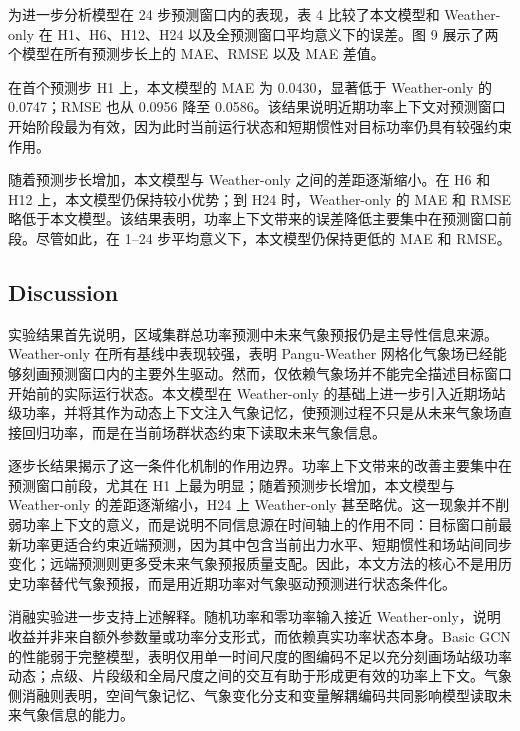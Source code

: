 为进一步分析模型在 24 步预测窗口内的表现，表 4 比较了本文模型和 Weather-only 在 H1、H6、H12、H24 以及全预测窗口平均意义下的误差。图 9 展示了两个模型在所有预测步长上的 MAE、RMSE 以及 MAE 差值。


在首个预测步 H1 上，本文模型的 MAE 为 0.0430，显著低于 Weather-only 的 0.0747；RMSE 也从 0.0956 降至 0.0586。该结果说明近期功率上下文对预测窗口开始阶段最为有效，因为此时当前运行状态和短期惯性对目标功率仍具有较强约束作用。

随着预测步长增加，本文模型与 Weather-only 之间的差距逐渐缩小。在 H6 和 H12 上，本文模型仍保持较小优势；到 H24 时，Weather-only 的 MAE 和 RMSE 略低于本文模型。该结果表明，功率上下文带来的误差降低主要集中在预测窗口前段。尽管如此，在 1--24 步平均意义下，本文模型仍保持更低的 MAE 和 RMSE。


\subsection{Discussion}

实验结果首先说明，区域集群总功率预测中未来气象预报仍是主导性信息来源。Weather-only 在所有基线中表现较强，表明 Pangu-Weather 网格化气象场已经能够刻画预测窗口内的主要外生驱动。然而，仅依赖气象场并不能完全描述目标窗口开始前的实际运行状态。本文模型在 Weather-only 的基础上进一步引入近期场站级功率，并将其作为动态上下文注入气象记忆，使预测过程不只是从未来气象场直接回归功率，而是在当前场群状态约束下读取未来气象信息。

逐步长结果揭示了这一条件化机制的作用边界。功率上下文带来的改善主要集中在预测窗口前段，尤其在 H1 上最为明显；随着预测步长增加，本文模型与 Weather-only 的差距逐渐缩小，H24 上 Weather-only 甚至略优。这一现象并不削弱功率上下文的意义，而是说明不同信息源在时间轴上的作用不同：目标窗口前最新功率更适合约束近端预测，因为其中包含当前出力水平、短期惯性和场站间同步变化；远端预测则更多受未来气象预报质量支配。因此，本文方法的核心不是用历史功率替代气象预报，而是用近期功率对气象驱动预测进行状态条件化。

消融实验进一步支持上述解释。随机功率和零功率输入接近 Weather-only，说明收益并非来自额外参数量或功率分支形式，而依赖真实功率状态本身。Basic GCN 的性能弱于完整模型，表明仅用单一时间尺度的图编码不足以充分刻画场站级功率动态；点级、片段级和全局尺度之间的交互有助于形成更有效的功率上下文。气象侧消融则表明，空间气象记忆、气象变化分支和变量解耦编码共同影响模型读取未来气象信息的能力。

